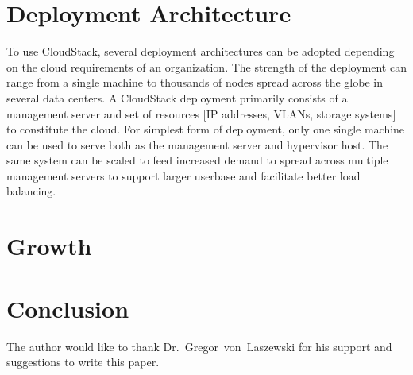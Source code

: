 \section{Deployment Architecture}
To use CloudStack, several deployment architectures can be adopted depending on the cloud requirements of an
organization. The strength of the deployment can range from a single machine to thousands of nodes spread across the 
globe in several data centers. A CloudStack deployment primarily consists of a management server and set of resources [IP addresses,
VLANs, storage systems] to constitute the cloud.   For simplest form of deployment, only one single machine can be used
to serve both as the management server and hypervisor host. The same system can be scaled to feed increased demand to spread across 
multiple management servers to support larger userbase and facilitate better load balancing.


\section{Growth}

\section{Conclusion}

\begin{acks}

  The author would like to thank Dr.~Gregor~von~Laszewski for his
  support and suggestions to write this paper.

\end{acks}


 

